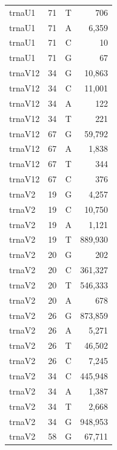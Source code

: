 \documentclass[12pt]{rockefeller}
\begin{document}
{\begin{center}
\begin{supertabular}{|l|r|c|r|}
  trnaU1 &        71 &          T &        706 \\
  trnaU1 &        71 &          A &      6,359 \\
  trnaU1 &        71 &          C &         10 \\
  trnaU1 &        71 &          G &         67 \\
 trnaV12 &        34 &          G &     10,863 \\
 trnaV12 &        34 &          C &     11,001 \\
 trnaV12 &        34 &          A &        122 \\
 trnaV12 &        34 &          T &        221 \\
 trnaV12 &        67 &          G &     59,792 \\
 trnaV12 &        67 &          A &      1,838 \\
 trnaV12 &        67 &          T &        344 \\
 trnaV12 &        67 &          C &        376 \\
  trnaV2 &        19 &          G &      4,257 \\
  trnaV2 &        19 &          C &     10,750 \\
  trnaV2 &        19 &          A &      1,121 \\
  trnaV2 &        19 &          T &    889,930 \\
  trnaV2 &        20 &          G &        202 \\
  trnaV2 &        20 &          C &    361,327 \\
  trnaV2 &        20 &          T &    546,333 \\
  trnaV2 &        20 &          A &        678 \\
  trnaV2 &        26 &          G &    873,859 \\
  trnaV2 &        26 &          A &      5,271 \\
  trnaV2 &        26 &          T &     46,502 \\
  trnaV2 &        26 &          C &      7,245 \\
  trnaV2 &        34 &          C &    445,948 \\
  trnaV2 &        34 &          A &      1,387 \\
  trnaV2 &        34 &          T &      2,668 \\
  trnaV2 &        34 &          G &    948,953 \\
  trnaV2 &        58 &          G &     67,711 \\

\end{supertabular}
\end{center}}
\end{document}
